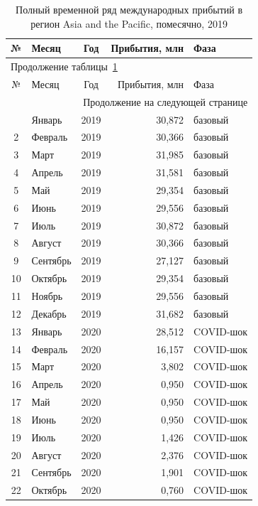 \begin{center}
\begin{longtable}{c l c r l}
\caption{Полный временной ряд международных прибытий в регион
Asia and the Pacific, помесячно, 2019}
\label{tab:full} \\
\toprule
№ & Месяц    & Год  & Прибытия, млн & Фаза \\
\midrule
\endfirsthead
\multicolumn{5}{l}{\small Продолжение таблицы~\ref{tab:full}} \\
\toprule
№ & Месяц    & Год  & Прибытия, млн & Фаза \\
\midrule
\endhead
\midrule
\multicolumn{5}{r}{\small Продолжение на следующей странице} \\
\endfoot
\bottomrule
\endlastfoot
1  & Январь   & 2019 & 30,872 & базовый  \\
2  & Февраль  & 2019 & 30,366 & базовый  \\
3  & Март     & 2019 & 31,985 & базовый  \\
4  & Апрель   & 2019 & 31,581 & базовый  \\
5  & Май      & 2019 & 29,354 & базовый  \\
6  & Июнь     & 2019 & 29,556 & базовый  \\
7  & Июль     & 2019 & 30,872 & базовый  \\
8  & Август   & 2019 & 30,366 & базовый  \\
9  & Сентябрь & 2019 & 27,127 & базовый  \\
10 & Октябрь  & 2019 & 29,354 & базовый  \\
11 & Ноябрь   & 2019 & 29,556 & базовый  \\
12 & Декабрь  & 2019 & 31,682 & базовый  \\
13 & Январь   & 2020 & 28,512 & COVID-шок \\
14 & Февраль  & 2020 & 16,157 & COVID-шок \\
15 & Март     & 2020 & 3,802  & COVID-шок \\
16 & Апрель   & 2020 & 0,950  & COVID-шок \\
17 & Май      & 2020 & 0,950  & COVID-шок \\
18 & Июнь     & 2020 & 0,950  & COVID-шок \\
19 & Июль     & 2020 & 1,426  & COVID-шок \\
20 & Август   & 2020 & 2,376  & COVID-шок \\
21 & Сентябрь & 2020 & 1,901  & COVID-шок \\
22 & Октябрь  & 2020 & 0,760  & COVID-шок \\

\end{longtable}
\end{center}
